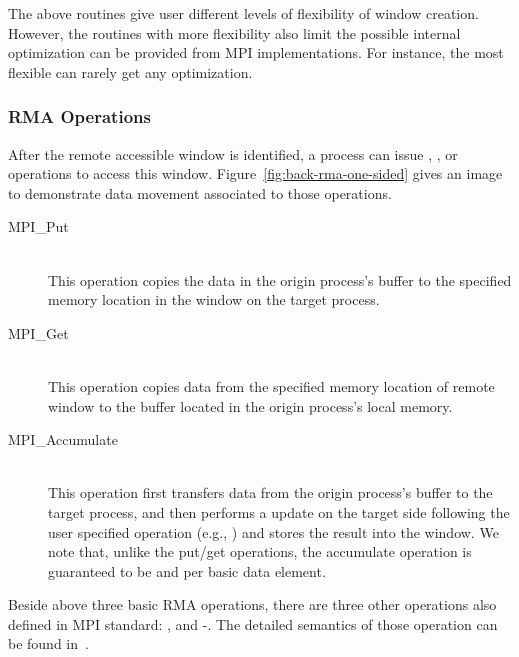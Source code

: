 The above routines give user different levels of flexibility of window
creation. However, the routines with more flexibility also limit the possible
internal optimization can be provided from MPI implementations. For instance,
the most flexible  can rarely get any
optimization.

\subsubsection{RMA Operations}

After the remote accessible window is identified, a process can issue
, , or  operations to access this
window. Figure~\ref{fig:back-rma-one-sided} gives an image to demonstrate
data movement associated to those operations.

\begin{description}
\item[MPI\_Put]\hfill \\
This operation copies the data in the origin process's buffer to
the specified memory location in the window on the target process.

\item[MPI\_Get]\hfill \\
This operation copies data from the specified memory location
of remote window to the buffer located in the origin process's
local memory.

\item[MPI\_Accumulate]\hfill \\
This operation first transfers data from the origin process's buffer
to the target process, and then performs a update on the target side
following the user specified operation (e.g., ) and stores
the result into the window. We note that, unlike the put\slash get
operations, the accumulate operation is guaranteed to be  and
 per basic data element.
\end{description}

Beside above three basic RMA operations, there are three other
operations also defined in MPI standard: ,
 and -. The detailed
semantics of those operation can be found in~\cite{mpi30-report}.

